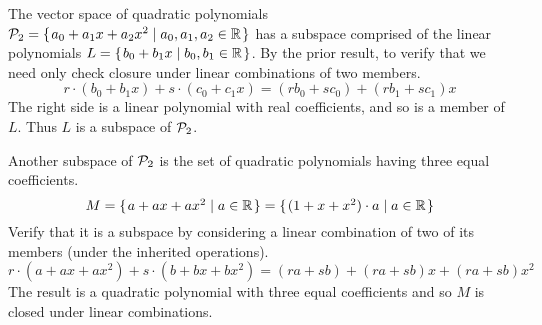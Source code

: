 \begin{frame}
\ex
The vector space of quadratic polynomials
$\mathcal{P}_2=\mbox{$\{\hspace{0.1em}a_0+a_1x+a_2x^2\mid a_0,a_1,a_2\in\mathbb{R}\hspace{0.1em}\}$}$ has a subspace
comprised of the linear polynomials
$L=\mbox{$\{\hspace{0.1em}b_0+b_1x\mid b_0,b_1\in\mathbb{R}\hspace{0.1em}\}$}$.
By the prior result, to verify that we need only check 
closure under linear combinations of two members.
\begin{equation*}
  r\cdot(b_0+b_1x)+s\cdot(c_0+c_1x)=(rb_0+sc_0)+(rb_1+sc_1)x
\end{equation*}
The right side is a linear polynomial with real coefficients, and so is a 
member of $L$.
Thus $L$ is a subspace of $\mathcal{P}_2$.

\pause
\ex
Another subspace of $\mathcal{P}_2$ is the set of quadratic polynomials
having three equal coefficients.
\begin{equation*}
  M=\mbox{$\{\hspace{0.1em}a+ax+ax^2\mid a\in\mathbb{R}\hspace{0.1em}\}$}
   =\mbox{$\{\hspace{0.1em}(1+x+x^2)\cdot a\mid a\in\mathbb{R}\hspace{0.1em}\}$}
\end{equation*}
Verify that it is a subspace by
considering a linear combination of two of its members
(under the inherited operations).
\begin{equation*}
  r\cdot(a+ax+ax^2)+s\cdot(b+bx+bx^2)
  =(ra+sb)+(ra+sb)x+(ra+sb)x^2
\end{equation*}
The result is a quadratic polynomial with three equal coefficients  
and so $M$ is closed under linear combinations.
\end{frame}





